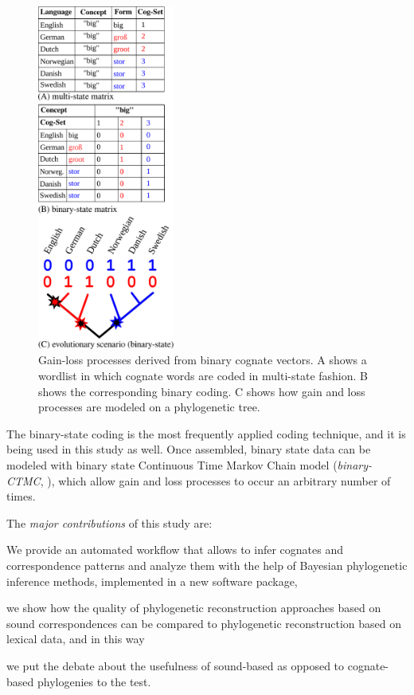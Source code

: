 \documentclass[10pt, a4paper]{article}
\begin{document}
\begin{figure}[tb!]
  \centering
  \includegraphics[width=0.4\textwidth]{figures/figure-1.pdf}
  \caption{Gain-loss processes derived from binary cognate vectors. A shows a wordlist in which
    cognate words are coded in multi-state fashion. B shows the corresponding binary coding. C shows
    how gain and loss processes are modeled on a phylogenetic tree.}\label{fig:1}
\end{figure}


The binary-state coding is the most frequently applied coding technique, and it is being used in this study as well. Once assembled, binary state data can be modeled with binary state Continuous Time Markov Chain model (\emph{binary-CTMC}, \citealt{bouckaert2012mapping}), which allow gain and loss processes to occur an arbitrary number of times.

The \textit{major contributions} of this study are:
\begin{inparaenum}[(1)]
  \item We provide an automated workflow that allows to infer cognates and correspondence patterns and analyze them with the help of Bayesian phylogenetic inference methods, implemented in a new software package,
  \item we show how the quality of phylogenetic reconstruction approaches based on sound correspondences can be compared to phylogenetic reconstruction based on lexical data, and in this way
  \item we put the debate about the usefulness of sound-based as opposed to cognate-based phylogenies to the test.
\end{inparaenum}
\end{document}
